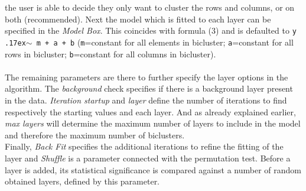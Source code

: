 \documentclass[a4paper]{article}\usepackage[]{graphicx}\usepackage[]{color}
\begin{document}
the user is able to decide they only want to cluster the rows and columns, or on
both (recommended). Next the model which is fitted to each layer can be
specified in the {\it Model Box}. This coincides with formula (3) and is
defaulted to \texttt{y {\raise.17ex\hbox{$\mathtt{\scriptstyle\sim}$}} m + a +
b} (\verb|m|=constant for all elements in bicluster; \verb|a|=constant for all rows in bicluster; \verb|b|=constant for all columns in
bicluster). 
\\ \\
\noindent The remaining parameters are there to further specify the layer
options in the algorithm. The {\it background} check specifies if there is a
background layer present in the data. {\it Iteration startup} and {\it layer}
define the number of iterations to find respectively the starting values and
each layer. And as already explained earlier, {\it max layers} will determine
the maximum number of layers to include in the model and therefore the maximum
number of biclusters. \\
Finally, {\it Back Fit} specifies the additional iterations to refine the
fitting of the layer and {\it Shuffle} is a parameter connected with the
permutation test. Before a layer is added, its statistical significance is
compared against a number of random obtained layers, defined by this parameter.
\end{document}
